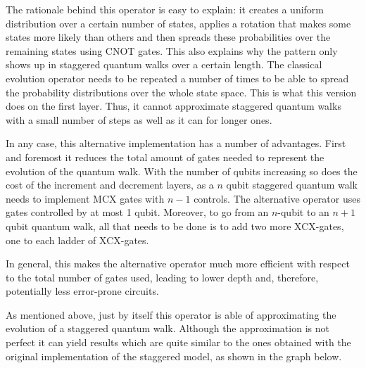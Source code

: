 The rationale behind this operator is easy to explain: it creates a uniform distribution over a certain number of states, applies a rotation that makes some states more likely than others and then spreads these probabilities over the remaining states using CNOT gates. This also explains why the pattern only shows up in staggered quantum walks over a certain length. 
The classical evolution operator 
needs to be repeated a number of times to be able to spread the probability distributions over the whole state space. This is what this version  does on the first layer. Thus, it cannot approximate staggered quantum walks with a small number of steps  as well as it can for longer ones.



In any case, this alternative implementation has a number of advantages. First and foremost it reduces the total amount of gates needed to represent the evolution of the quantum walk. With the number of qubits increasing so does the cost of the increment and decrement layers, as a $n$ qubit staggered quantum walk needs to implement MCX gates with $n-1$ controls. 
The alternative operator uses gates controlled by at most 1 qubit. Moreover, to go from an $n$-qubit to an $n+1$ qubit quantum walk, all that needs to be done is to add two more XCX-gates, one to each ladder of XCX-gates. %

In general, this makes the alternative operator much more efficient with respect to the total number of gates used, leading to lower depth  and, therefore, potentially less error-prone circuits.

As mentioned above, just by itself this operator is able of approximating the evolution of a staggered quantum walk. Although the approximation is not perfect it can yield results which are  quite similar to the ones obtained with the original implementation of the staggered model, as shown in the graph below.

